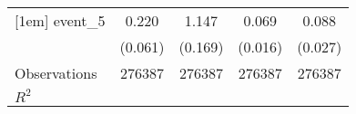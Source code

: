 {\begin{tabular}{l*{4}{c}}
[1em]
event\_5             &       0.220\sym{***}&       1.147\sym{***}&       0.069\sym{***}&       0.088\sym{***}\\
                    &     (0.061)         &     (0.169)         &     (0.016)         &     (0.027)         \\
\hline
Observations        &      276387         &      276387         &      276387         &      276387         \\
\(R^{2}\)           &                     &                     &                     &                     \\
\hline\hline
\end{tabular}
}
